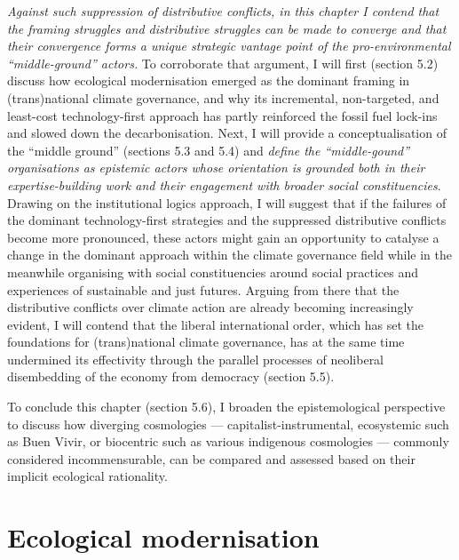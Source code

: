\documentclass[a4paper, nobind]{templates/ociamthesis}
\begin{document}
\emph{Against such suppression of distributive conflicts, in this chapter I contend that the framing struggles and distributive struggles can be made to converge and that their convergence forms a unique strategic vantage point of the pro-environmental ``middle-ground'' actors.} To corroborate that argument, I will first (section 5.2) discuss how ecological modernisation emerged as the dominant framing in (trans)national climate governance, and why its incremental, non-targeted, and least-cost technology-first approach has partly reinforced the fossil fuel lock-ins and slowed down the decarbonisation. Next, I will provide a conceptualisation of the ``middle ground'' (sections 5.3 and 5.4) and \emph{define the ``middle-gound'' organisations as epistemic actors whose orientation is grounded both in their expertise-building work and their engagement with broader social constituencies}. Drawing on the institutional logics approach, I will suggest that if the failures of the dominant technology-first strategies and the suppressed distributive conflicts become more pronounced, these actors might gain an opportunity to catalyse a change in the dominant approach within the climate governance field while in the meanwhile organising with social constituencies around social practices and experiences of sustainable and just futures. Arguing from there that the distributive conflicts over climate action are already becoming increasingly evident, I will contend that the liberal international order, which has set the foundations for (trans)national climate governance, has at the same time undermined its effectivity through the parallel processes of neoliberal disembedding of the economy from democracy (section 5.5).

To conclude this chapter (section 5.6), I broaden the epistemological perspective to discuss how diverging cosmologies --- capitalist-instrumental, ecosystemic such as Buen Vivir, or biocentric such as various indigenous cosmologies --- commonly considered incommensurable, can be compared and assessed based on their implicit ecological rationality.

\hypertarget{ecological-modernisation}{%
\section{Ecological modernisation}\label{ecological-modernisation}}
\end{document}
